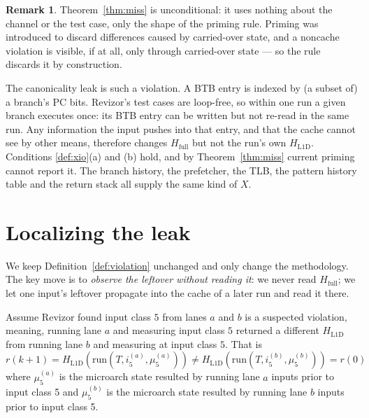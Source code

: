 \documentclass[11pt]{article}
\theoremstyle{definition}
\newtheorem{remark}{Remark}
\theoremstyle{plain}
\newcommand{\run}{\mathrm{run}}
\newcommand{\HL}{H_{\mathrm{L1D}}}
\newcommand{\HF}{H_{\mathrm{full}}}
\newcommand{\inp}[2]{i_{#1}^{(#2)}}
\begin{document}
\begin{remark}
Theorem~\ref{thm:miss} is unconditional: it uses nothing about the channel or the test
case, only the shape of the priming rule. Priming was introduced to discard differences
caused by carried-over state, and a noncache violation is visible, if at all, only
through carried-over state --- so the rule discards it by construction.
\end{remark}

The canonicality leak is such a violation. A BTB entry is indexed by (a subset of) a
branch's PC bits. Revizor's test cases are loop-free, so within one run a given branch
executes once: its BTB entry can be written but not re-read in the same run. Any
information the input pushes into that entry, and that the cache cannot see by other
means, therefore changes $\HF$ but not the run's own $\HL$. Conditions \ref{def:xio}(a)
and (b) hold, and by Theorem~\ref{thm:miss} current priming cannot report it. The branch
history, the prefetcher, the TLB, the pattern history table and the return stack all
supply the same kind of $X$.

\section{Localizing the leak}
\label{sec:localize}

We keep Definition~\ref{def:violation} unchanged and only change the methodology. The
key move is to \emph{observe the leftover without reading it}: we never read $\HF$; we
let one input's leftover propagate into the cache of a later run and read it there.

Assume Revizor found input class $5$ from lanes $a$ and $b$ is a suspected violation, meaning, running lane $a$ and measuring input class $5$ returned a different $\HL$ from running lane $b$ and measuring at input class $5$. That is $r(k+1)=\HL(\run(T,\inp{5}{a}, \mu_5^{(a)}))\neq \HL(\run(T,\inp{5}{b}, \mu_5^{(b)}))=r(0)$ where $\mu_5^{(a)}$ is the microarch state resulted by running lane $a$ inputs prior to input class 5 and $\mu_5^{(b)}$  is the microarch state resulted by running lane $b$ inputs prior to input class 5.
\end{document}
